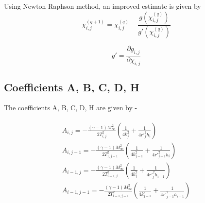 \documentclass[a4paper]{report}
\begin{document}
	Using Newton Raphson method, an improved estimate is given by
	\begin{equation}
	\chi^{(q+1)}_{i,j} = \chi^{(q)}_{i,j}
	- \frac{g(\chi^{(q)}_{i,j})}{g'(\chi^{(q)}_{i,j})}
	\end{equation}
	
	\begin{equation}
	g' = \frac{\partial g_{i,j}}{\partial \chi_{i,j}}
	\end{equation}
	
	
	\subsection{Coefficients A, B, C, D, H}
	The coefficients A, B, C, D, H are given by - 
	
	\begin{align}
		\begin{split}		
		A_{i,j} = -\frac{(\gamma-1)M_\infty^2}{2T_{i,j}^2}
		\left(
			\frac{1}{4k_j^2} + \frac{1}{4{r'}_j^2 h_i}
		\right) \\
		A_{i,j-1} = -\frac{(\gamma-1)M_\infty^2}{2T_{1,j-1}^2}
		\left(
			\frac{1}{4k_{j-1}^2} + \frac{1}{4{r'}_{j-1}^2 h_i}
		\right) \\
		A_{i-1,j} = -\frac{(\gamma-1)M_\infty^2}{2T_{i-1,j}^2}
		\left(
			\frac{1}{4k_j^2} + \frac{1}{4{r'}_j^2 h_{i-1}}
		\right) \\
		A_{i-1,j-1} = -\frac{(\gamma-1)M_\infty^2}{2T_{i-1,j-1}^2}
		\left(
			\frac{1}{4k_{j-1}^2} + \frac{1}{4{r'}_{j-1}^2 h_{i-1}}
		\right)
		\end{split}
	\end{align}
	
\end{document}
